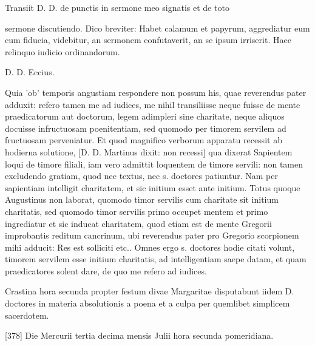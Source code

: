 Transiit D. D. de punctis in sermone meo signatis et de toto

sermone discutiendo. Dico breviter: Habet calamum et papyrum, aggrediatur eum cum fiducia, videbitur, an sermonem confutaverit, an se ipsum irriserit. Haec relinquo iudicio ordinandorum.

D. D. Eccius.

Quia 'ob' temporis angustiam respondere non possum his, quae reverendus pater adduxit: refero tamen me ad iudices, me nihil transiliisse neque fuisse de mente praedicatorum aut doctorum, legem adimpleri sine charitate, neque aliquos docuisse infructuosam poenitentiam, sed quomodo per timorem servilem ad fructuosam perveniatur. Et quod magnifico verborum apparatu recessit ab hodierna solutione, [D. D. Martinus dixit: non recessi] qua dixerat Sapientem loqui de timore filiali, iam vero admittit loquentem de timore servili: non tamen excludendo gratiam, quod nec textus, nec s. doctores patiuntur. Nam per sapientiam intelligit charitatem, et sic initium esset ante initium. Totus quoque Augustinus non laborat, quomodo timor servilis cum charitate sit initium charitatis, sed quomodo timor servilis primo occupet mentem et primo ingrediatur et sic inducat charitatem, quod etiam est de mente Gregorii improbantis reditum cancrinum, ubi reverendus pater pro Gregorio scorpionem mihi adducit: Res est solliciti etc.. Omnes ergo s. doctores hodie citati volunt, timorem servilem esse initium charitatis, ad intelligentiam saepe datam, et quam praedicatores solent dare, de quo me refero ad iudices.

Crastina hora secunda propter festum divae Margaritae disputabunt iidem D. doctores in materia absolutionis a poena et a culpa per quemlibet simplicem sacerdotem.

[378] Die Mercurii tertia decima mensis Julii hora secunda pomeridiana.

